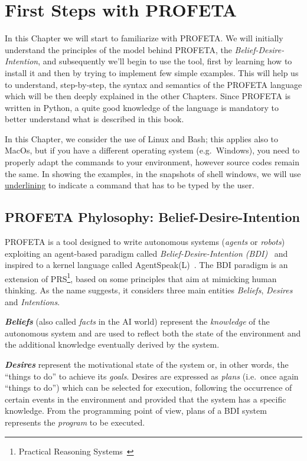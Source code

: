 \chapter{First Steps with PROFETA}
In this Chapter we will start to familiarize with PROFETA.
We will initially understand the principles of the model behind PROFETA, the
\emph{Belief-Desire-Intention}, and subsequently we'll begin to use the
tool, first by learning how to install it and then by trying to implement
few simple examples.
This will help us to understand, step-by-step, the syntax and semantics of
the PROFETA language which will be then deeply explained in the other
Chapters.
Since PROFETA is written in Python, a quite good knowledge of the language
is mandatory to better understand what is described in this book.

In this Chapter, we consider the use of Linux and Bash; this applies also
to MacOs, but if you
have a different operating system (e.g.~Windows), you need to properly
adapt the commands to your environment, however source codes remain the
same.
In showing the examples, in the snapshots of shell windows, we will use
\underline{underlining} to indicate a command that has to be typed by the
user.



\section{PROFETA Phylosophy: Belief-Desire-Intention}
PROFETA is a tool designed to write autonomous systems (\emph{agents} or
\emph{robots}) exploiting an
agent-based paradigm called
\emph{Belief-Desire-Intention (BDI)}~\cite{rao1995bdi} and inspired to a
kernel language called AgentSpeak(L)~\cite{AgentSpeak}.
The BDI paradigm is an extension of PRS\footnote{Practical Reasoning
  Systems~\cite{PRSarchitecture}}, based on some principles that aim at
mimicking human thinking.
As the name suggests, it considers three main entities \emph{Beliefs},
\emph{Desires} and \emph{Intentions}.

\textbf{\emph{Beliefs}} (also called \emph{facts} in the AI world)
represent the
\emph{knowledge} of the autonomous system and
are used to reflect both the state of the environment and the additional
knowledge eventually derived by the system.

\textbf{\emph{Desires}} represent the motivational state of the system or,
in other words, the ``things to do'' to achieve its \emph{goals}.
Desires are expressed as \emph{plans} (i.e.~once again
``things to do'') which can be selected for execution, following the
occurrence of certain
events in the environment and provided that the system has a specific
knowledge.
From the programming point of view, plans of a BDI system
represents the \emph{program} to be executed.

